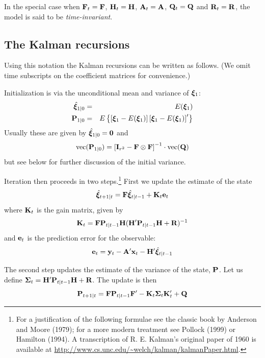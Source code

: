 \documentclass[a4paper]{article}
\newcommand{\obsvec}{\ensuremath\mathbf{y}}
\newcommand{\obsmat}{\ensuremath\mathbf{H}}
\newcommand{\obsx}{\ensuremath\mathbf{x}}
\newcommand{\obsxmat}{\ensuremath\mathbf{A}}
\newcommand{\obsvar}{\ensuremath\mathbf{R}}
\newcommand{\statevec}{\ensuremath\mathbf{\bm \xi}}
\newcommand{\statemat}{\ensuremath\mathbf{F}}
\newcommand{\strvar}{\ensuremath\mathbf{Q}}
\newcommand{\statevar}{\ensuremath\mathbf{P}}
\newcommand{\gain}{\ensuremath\mathbf{K}}
\newcommand{\prederr}{\ensuremath\mathbf{e}}
\newcommand{\predvar}{\ensuremath{\bm\Sigma}}
\newcommand{\myvec}{\mbox{vec}}
\begin{document}
In the special case when $\statemat_t = \statemat$, $\obsmat_t = \obsmat$,
$\obsxmat_t = \obsxmat$, $\strvar_t = \strvar$ and $\obsvar_t =
\obsvar$, the model is said to be \emph{time-invariant}.

\subsection{The Kalman recursions}

Using this notation the Kalman recursions can be written as follows.
(We omit time subscripts on the coefficient matrices for convenience.)

Initialization is via the unconditional mean and variance of
$\statevec_1$:
%
\begin{eqnarray*}
\hat{\statevec}_{1|0} &=& E(\statevec_1) \\
\statevar_{1|0} &=& E\left\{\left[\statevec_1 - E(\statevec_1)\right]
   \left[\statevec_1 - E(\statevec_1)\right]' \right\}
\end{eqnarray*}
Usually these are given by $\hat{\statevec}_{1|0} = \mathbf{0}$ and
\begin{equation}
\label{eq:inivar}
\myvec(\statevar_{1|0}) = \left[\mathbf{I}_{r^2} - \statemat \otimes
  \statemat\right]^{-1} \cdot \myvec(\strvar)
\end{equation}
but see below for further discussion of the initial variance.

Iteration then proceeds in two steps.\footnote{For a justification of
  the following formulae see the classic book by Anderson and Moore
  (1979); for a more modern treatment see Pollock (1999) or Hamilton
  (1994).  A transcription of R. E. Kalman's original paper of 1960 is
  available at
  \url{http://www.cs.unc.edu/~welch/kalman/kalmanPaper.html}.}  First
we update the estimate of the state
%
\begin{equation}
\hat{\statevec}_{t+1|t} = \statemat\hat{\statevec}_{t|t-1} + 
  \gain_t \prederr_t
\end{equation}
%
where $\gain_t$ is the gain matrix, given by
%
\begin{equation}
\label{eq:gain}
\gain_t = \statemat\statevar_{t|t-1}\obsmat
  (\obsmat'\statevar_{t|t-1}\obsmat + \obsvar)^{-1}
\end{equation}
%
and $\prederr_t$ is the prediction error for the observable:
\[
\prederr_t = \obsvec_t - \obsxmat'\obsx_t - \obsmat' \hat{\statevec}_{t|t-1}
\]

The second step updates the estimate of the variance of the state,
$\statevar$.  Let us define $\predvar_t =
\obsmat'\statevar_{t|t-1}\obsmat + \obsvar$.  The update is then
\begin{equation}
\statevar_{t+1|t} = \statemat\statevar_{t|t-1}\statemat' -
 \gain_t \predvar_t \gain_t' + \strvar
\end{equation}
\end{document}
